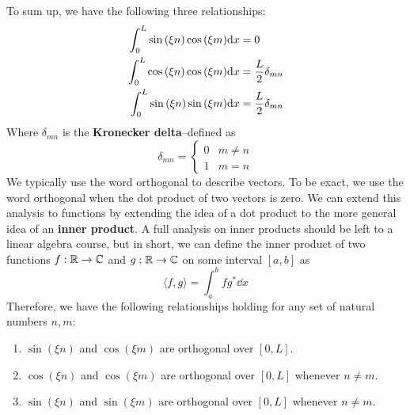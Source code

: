 To sum up, we have the following three relationships:
\begin{align*}
    \int_0^L \sin\pqty{\xi n}\cos\pqty{\xi m}\dd x &= 0 \\
    \int_0^L \cos\pqty{\xi n}\cos\pqty{\xi m}\dd x &= \frac{L}{2}\delta_{mn} \\
    \int_0^L \sin\pqty{\xi n}\sin\pqty{\xi m}\dd x &= \frac{L}{2}\delta_{mn}
\end{align*}
Where $\delta_{mn}$ is the \textbf{Kronecker delta}--defined as
\[ \delta_{mn} = \begin{cases}
    0 & m \ne n \\
    1 & m =n
\end{cases}\]
We typically use the word orthogonal to describe vectors. To be exact, we use the word orthogonal when the dot product of two vectors is zero. We can extend this analysis to functions by extending the idea of a dot product to the more general idea of an \textbf{inner product}. A full analysis on inner products should be left to a linear algebra course, but in short, we can define the inner product of two functions $f: \mathbb{R} \to \mathbb{C}$ and $g: \mathbb{R} \to \mathbb{C}$ on some interval $[a,b]$ as 
\[ \langle f, g\rangle = \int_a^b fg^* \dd x\]
Therefore, we have the following relationships holding for any set of natural numbers $n, m$:
\begin{enumerate}
    \item $\sin(\xi n)$ and $\cos(\xi m)$ are orthogonal over $[0, L]$.
    \item $\cos(\xi n)$ and $\cos(\xi m)$ are orthogonal over $[0, L]$ whenever $n\ne m$.
    \item $\sin(\xi n)$ and $\sin(\xi m)$ are orthogonal over $[0, L]$ whenever $n\ne m$.
\end{enumerate}
